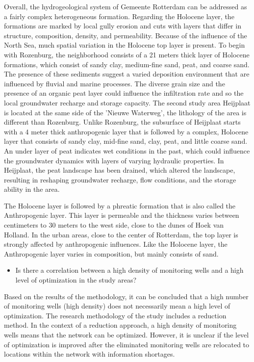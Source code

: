 Overall, the hydrogeological system of Gemeente Rotterdam can be addressed as a fairly complex heterogeneous formation. Regarding the Holocene layer, the formations are marked by local gully erosion and cuts with layers that differ in structure, composition, density, and permeability. Because of the influence of the North Sea, much spatial variation in the Holocene top layer is present. To begin with Rozenburg, the neighborhood consists of a 21 meters thick layer of Holocene formations, which consist of sandy clay, medium-fine sand, peat, and coarse sand. The presence of these sediments suggest a varied deposition environment that are influenced by fluvial and marine processes. The diverse grain size and the presence of an organic peat layer could influence the infiltration rate and so the local groundwater recharge and storage capacity. The second study area Heijplaat is located at the same side of the 'Nieuwe Waterweg', the lithology of the area is different than Rozenburg. Unlike Rozenburg, the subsurface of Heijplaat starts with a 4 meter thick anthropogenic layer that is followed by a complex, Holocene layer that consists of sandy clay, mid-fine sand, clay, peat, and little coarse sand. An under layer of peat indicates wet conditions in the past, which could influence the groundwater dynamics with layers of varying hydraulic properties. In Heijplaat, the peat landscape has been drained, which altered the landscape, resulting in reshaping groundwater recharge, flow conditions, and the storage ability in the area. 

The Holocene layer is followed by a phreatic formation that is also called the Anthropogenic layer. This layer is permeable and the thickness varies between centimeters to 30 meters to the west side, close to the dunes of Hoek van Holland. In the urban areas, close to the center of Rotterdam, the top layer is strongly affected by anthropogenic influences. Like the Holocene layer, the Anthropogenic layer varies in composition, but mainly consists of sand. 





\begin{itemize}
    \item Is there a correlation between a high density of monitoring wells and a high level of optimization in the study areas?

\end{itemize}

Based on the results of the methodology, it can be concluded that a high number of monitoring wells (high density) does not necessarily mean a high level of optimization. The research methodology of the study includes a reduction method. In the context of a reduction approach, a high density of monitoring wells means that the network can be optimized. However, it is unclear if the level of optimization is improved after the eliminated monitoring wells are relocated to locations within the network with information shortages. 

